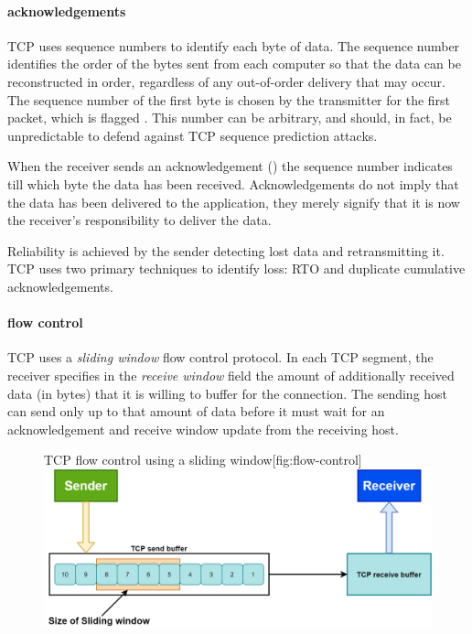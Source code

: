 \paragraph{acknowledgements}
\ac{TCP} uses sequence numbers to identify each byte of data.
The sequence number identifies the order of the bytes sent from each computer so that the data can be reconstructed in order, regardless of any out-of-order delivery that may occur.
The sequence number of the first byte is chosen by the transmitter for the first packet, which is flagged .
This number can be arbitrary, and should, in fact, be unpredictable to defend against \ac{TCP} sequence prediction attacks.

When the receiver sends an acknowledgement () the sequence number indicates till which byte the data has been received.
Acknowledgements do not imply that the data has been delivered to the application, they merely signify that it is now the receiver's responsibility to deliver the data.

Reliability is achieved by the sender detecting lost data and retransmitting it.
\ac{TCP} uses two primary techniques to identify loss: \acf{RTO} and duplicate cumulative acknowledgements.%



\paragraph{flow control}
\acs{TCP} uses a \emph{sliding window} flow control protocol.
In each \acs{TCP} segment, the receiver specifies in the \emph{receive window} field the amount of additionally received data (in bytes) that it is willing to buffer for the connection.
The sending host can send only up to that amount of data before it must wait for an acknowledgement and receive window update from the receiving host.


\begin{figure}
\begin{sidecaption}{\acs{TCP} flow control using a sliding window}[fig:flow-control]
\centering
\includegraphics[width=\textwidth]{images/transport/flow-control.png}
\end{sidecaption}
\end{figure}

